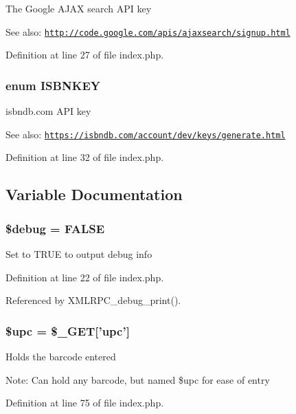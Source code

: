 The Google AJAX search API key \begin{Desc}
\item[See also:]\href{http://code.google.com/apis/ajaxsearch/signup.html}{\tt http://code.google.com/apis/ajaxsearch/signup.html} \end{Desc}


Definition at line 27 of file index.php.\hypertarget{index_8php_93bb4a6cf53ca9db8d391bc20eee6442}{
\subsubsection{\setlength{\rightskip}{0pt plus 5cm}enum {\bf ISBNKEY}}}
\label{index_8php_93bb4a6cf53ca9db8d391bc20eee6442}


isbndb.com API key \begin{Desc}
\item[See also:]\href{https://isbndb.com/account/dev/keys/generate.html}{\tt https://isbndb.com/account/dev/keys/generate.html} \end{Desc}


Definition at line 32 of file index.php.

\subsection{Variable Documentation}
\hypertarget{index_8php_85ae3e64cd40e9564adceb010085e9dd}{
\subsubsection{\setlength{\rightskip}{0pt plus 5cm}\$debug = FALSE}}
\label{index_8php_85ae3e64cd40e9564adceb010085e9dd}


Set to TRUE to output debug info 

Definition at line 22 of file index.php.

Referenced by XMLRPC\_\-debug\_\-print().\hypertarget{index_8php_a9aa17ff51d69075d75cfc5bc4e89b34}{
\subsubsection{\setlength{\rightskip}{0pt plus 5cm}\$upc = \$\_\-GET\mbox{[}'upc'\mbox{]}}}
\label{index_8php_a9aa17ff51d69075d75cfc5bc4e89b34}


Holds the barcode entered \begin{Desc}
\item[Note:]Can hold any barcode, but named \$upc for ease of entry \end{Desc}


Definition at line 75 of file index.php.